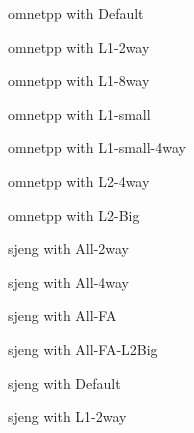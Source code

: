 \documentclass[cacheSimReport.tex]{subfiles}
\begin{document}
\pagebreak
\begin{center}
{\Large{omnetpp with Default}}
\end{center}

\pagebreak
\begin{center}
{\Large{omnetpp with L1-2way}}
\end{center}

\pagebreak
\begin{center}
{\Large{omnetpp with L1-8way}}
\end{center}

\pagebreak
\begin{center}
{\Large{omnetpp with L1-small}}
\end{center}

\pagebreak
\begin{center}
{\Large{omnetpp with L1-small-4way}}
\end{center}

\pagebreak
\begin{center}
{\Large{omnetpp with L2-4way}}
\end{center}

\pagebreak
\begin{center}
{\Large{omnetpp with L2-Big}}
\end{center}

\pagebreak
\begin{center}
{\Large{sjeng with All-2way}}
\end{center}

\pagebreak
\begin{center}
{\Large{sjeng with All-4way}}
\end{center}

\pagebreak
\begin{center}
{\Large{sjeng with All-FA}}
\end{center}

\pagebreak
\begin{center}
{\Large{sjeng with All-FA-L2Big}}
\end{center}

\pagebreak
\begin{center}
{\Large{sjeng with Default}}
\end{center}

\pagebreak
\begin{center}
{\Large{sjeng with L1-2way}}
\end{center}
\end{document}
